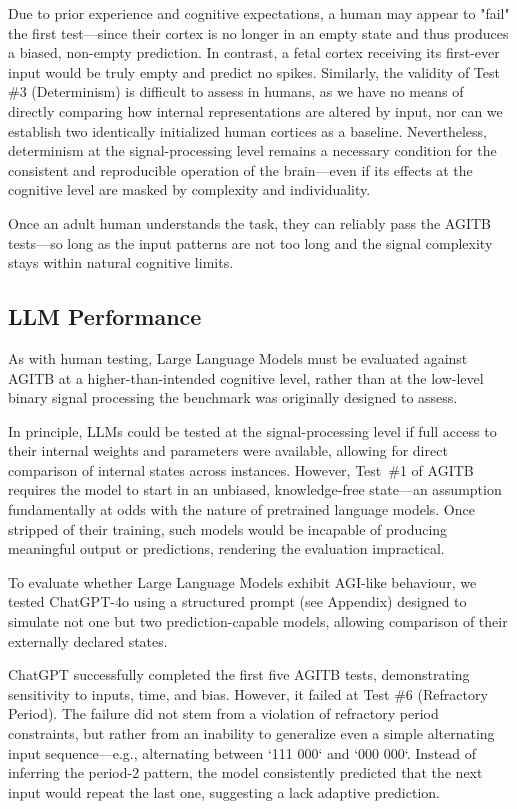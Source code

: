 \documentclass{article}
\begin{document}
Due to prior experience and cognitive expectations, a human may appear to "fail" the first test—since their cortex is no longer in an empty state and thus produces a biased, non-empty prediction. In contrast, a fetal cortex receiving its first-ever input would be truly empty and predict no spikes. Similarly, the validity of Test \#3 (Determinism) is difficult to assess in humans, as we have no means of directly comparing how internal representations are altered by input, nor can we establish two identically initialized human cortices as a baseline. Nevertheless, determinism at the signal-processing level remains a necessary condition for the consistent and reproducible operation of the brain—even if its effects at the cognitive level are masked by complexity and individuality.

Once an adult human understands the task, they can reliably pass the AGITB tests—so long as the input patterns are not too long and the signal complexity stays within natural cognitive limits.

\subsection{LLM Performance}

As with human testing, Large Language Models must be evaluated against AGITB at a higher-than-intended cognitive level, rather than at the low-level binary signal processing the benchmark was originally designed to assess.

In principle, LLMs could be tested at the signal-processing level if full access to their internal weights and parameters were available, allowing for direct comparison of internal states across instances. However, Test~\#1 of AGITB requires the model to start in an unbiased, knowledge-free state—an assumption fundamentally at odds with the nature of pretrained language models. Once stripped of their training, such models would be incapable of producing meaningful output or predictions, rendering the evaluation impractical.

To evaluate whether Large Language Models exhibit AGI-like behaviour, we tested ChatGPT-4o using a structured prompt (see Appendix) designed to simulate not one but two prediction-capable models, allowing comparison of their externally declared states.

ChatGPT successfully completed the first five AGITB tests, demonstrating sensitivity to inputs, time, and bias. However, it failed at Test \#6 (Refractory Period). The failure did not stem from a violation of refractory period constraints, but rather from an inability to generalize even a simple alternating input sequence—e.g., alternating between `111 000` and `000 000`. Instead of inferring the period-2 pattern, the model consistently predicted that the next input would repeat the last one, suggesting a lack adaptive prediction.
\end{document}
